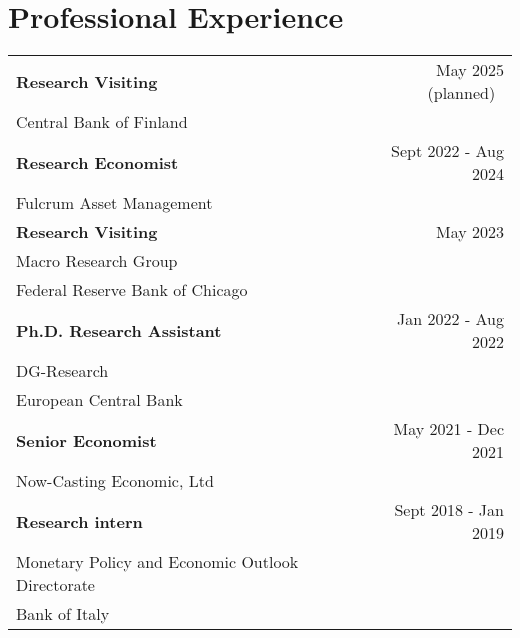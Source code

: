 \documentclass[a4paper,12pt]{article}
\begin{document}
\section{Professional Experience}
\begin{tabular*}{\linewidth}{@{}l@{\extracolsep{\fill}}r}
\textbf{Research Visiting} & May 2025 (planned)$\;\;$\\
Central Bank of Finland\\[1em]
\textbf{Research Economist} & Sept 2022 - Aug 2024\\[.2em]%
Fulcrum Asset Management\\[1em]
\textbf{Research Visiting} & May 2023 \phantom{-Sept 2024}\\
Macro Research Group\\
Federal Reserve Bank of Chicago\\[1em]
\textbf{Ph.D. Research Assistant} & Jan 2022 - Aug 2022\\[.2em]
DG-Research\\
European Central Bank\\[1em]
\textbf{Senior Economist} & May 2021 - Dec 2021\\[.2em]
Now-Casting Economic, Ltd\\[1em]
\textbf{Research intern} & Sept 2018 - Jan 2019\\[.2em]
Monetary Policy and Economic Outlook Directorate\\
Bank of Italy
\end{tabular*}
\end{document}
